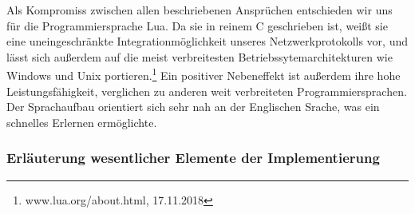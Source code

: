 \documentclass[12pt, a4paper]{scrartcl}
\begin{document}
Als Kompromiss zwischen allen beschriebenen Ansprüchen entschieden wir uns für die Programmiersprache Lua. Da sie in reinem C geschrieben ist, weißt sie eine uneingeschränkte Integrationmöglichkeit unseres Netzwerkprotokolls vor, und lässt sich außerdem auf die meist verbreitesten Betriebssytemarchitekturen wie Windows und Unix portieren.\footnote{www.lua.org/about.html, 17.11.2018} Ein positiver Nebeneffekt ist außerdem ihre hohe Leistungsfähigkeit, verglichen zu anderen weit verbreiteten Programmiersprachen. Der Sprachaufbau orientiert sich sehr nah an der Englischen Srache, was ein schnelles Erlernen ermöglichte. 


\subsubsection{Erläuterung wesentlicher Elemente der Implementierung}
\end{document}
